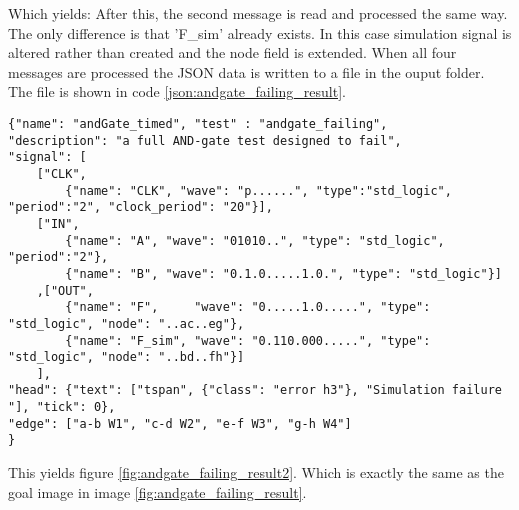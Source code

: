 Which yields:
\nline
After this, the second message is read and processed the same way. The only difference is that 'F\_sim' already exists. In this case simulation signal is altered rather than created and the node field is extended.
\npar
When all four messages are processed the JSON data is written to a file in the  ouput folder. The file is shown in code \ref{json:andgate_failing_result}.
\begin{lstlisting}[style=json, caption={Final content of the result file of a failing AND-gate example}, label={json:andgate_failing_result}]
{"name": "andGate_timed", "test" : "andgate_failing", 
"description": "a full AND-gate test designed to fail",
"signal": [
	["CLK",
		{"name": "CLK", "wave": "p......", "type":"std_logic", "period":"2", "clock_period": "20"}],
	["IN",
		{"name": "A", "wave": "01010..", "type": "std_logic", "period":"2"},
		{"name": "B", "wave": "0.1.0.....1.0.", "type": "std_logic"}]
	,["OUT",
		{"name": "F",     "wave": "0.....1.0.....", "type": "std_logic", "node": "..ac..eg"},
		{"name": "F_sim", "wave": "0.110.000.....", "type": "std_logic", "node": "..bd..fh"}]
	], 
"head": {"text": ["tspan", {"class": "error h3"}, "Simulation failure "], "tick": 0}, 
"edge": ["a-b W1", "c-d W2", "e-f W3", "g-h W4"]
}
\end{lstlisting}\noindent
This yields figure \ref{fig:andgate_failing_result2}.
\nline
Which is exactly the same as the goal image in image \ref{fig:andgate_failing_result}.\newpage

